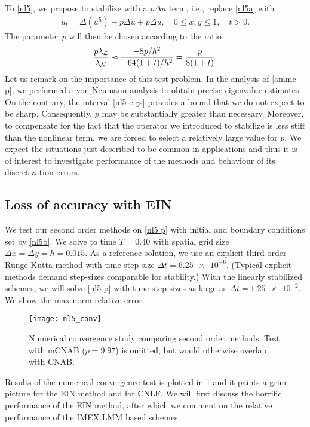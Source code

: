 To \cref{nl5}, we propose to stabilize with a $p\Delta u$ term, i.e., replace \cref{nl5a} with 
\begin{align}
        u_t = \Delta (u^5) - p\Delta u + p\Delta u, \quad 0\leq x,y\leq 1,
\quad t > 0.
\label{nl5 p}
\end{align}
The parameter $p$ will then be chosen according to the ratio
\begin{align}
        \frac{p\lambda_{\mathcal{L}}}{\lambda_{\mathcal{N}}}
\approx \frac{-8p/h^2}{-64(1+t)/h^2}
= \frac{p}{8(1+t)}.
\end{align}
Let us remark on the importance of this test problem. In the analysis of \cref{ammc p}, we performed a von Neumann analysis to obtain precise eigenvalue estimates. On the contrary, the interval \cref{nl5 eigs} provides a bound that we do not expect to be sharp. Consequently, $p$ may be substantially greater than necessary. Moreover, to compensate for the fact that the operator we introduced to stabilize is less stiff than the nonlinear term, we are forced to select a relatively large value for $p$. We expect the situations just described to be common in applications and thus it is of interest to investigate performance of the methods and behaviour of its discretization errors.

\subsection{Loss of accuracy with EIN}
We test our second order methods on \cref{nl5 p} with initial and boundary conditions set by \cref{nl5b}. We solve to time $T=0.40$ with spatial grid size $\Delta x = \Delta y = h =0.015$. As a reference solution, we use an explicit third order Runge-Kutta method with time step-size $\Delta t=\num{6.25e-6}$. (Typical explicit methods demand step-sizes comparable for stability.) With the linearly stabilized schemes, we will solve \cref{nl5 p} with time step-sizes as large as $\Delta t = \num{1.25e-2}$. We show the max norm relative error.

\begin{figure}[htb!]
        \centering
\texttt{[image: nl5\_conv]}
\caption[Numerical convergence study comparing second order methods.]{Numerical convergence study comparing second order methods. Test with mCNAB ($p=9.97$) is omitted, but would otherwise overlap with CNAB.}
\label{fig:nl5 conv}
\end{figure}

Results of the numerical convergence test is plotted in \cref{fig:nl5 conv} and it paints a grim picture for the EIN method and for CNLF. We will first discuss the horrific performance of the EIN method, after which we comment on the relative performance of the IMEX LMM based schemes. 

